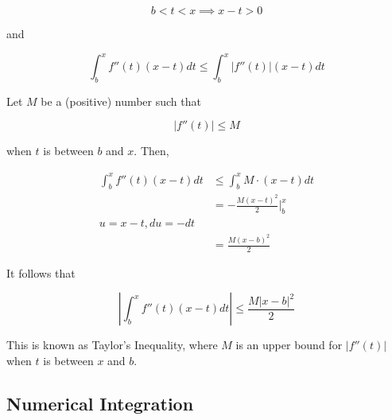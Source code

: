         \[
            b < t < x \implies x - t > 0
        \]

        and

        \[
            \int_b^x f''(t)(x-t)dt \leq \int_b^x |f''(t)| (x-t)dt
        \]

        Let $M$ be a (positive) number such that

        \[
            |f''(t)| \leq M
        \]

        when $t$ is between $b$ and $x$. Then,

        \begin{align*}
            \int_b^x f''(t)(x-t)dt  &\leq \int_b^x M\cdot (x-t) dt \\
                                    &= -\frac{M(x-t)^2}{2} \Big|_b^x \\
            u = x-t, du = -dt       \\
                                    &= \frac{M(x-b)^2}{2}
        \end{align*}

        It follows that

        \[
            \left|\int_b^x f''(t)(x-t)dt\right| \leq \frac{M|x-b|^2}{2}
        \]

        This is known as Taylor's Inequality, where $M$ is an upper bound for $|f''(t)|$ when $t$ is between $x$ and $b$.


    \subsection{Numerical Integration}

        







